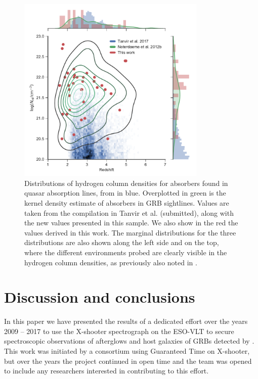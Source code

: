 \documentclass{aa}    %
\begin{document}
\begin{figure}[!ht]
	\centering \includegraphics[width=9cm]{figures/NH_dist.pdf}
\caption{Distributions of hydrogen column densities for absorbers found in
	quasar absorption lines, from \citet{Noterdaeme2012b} in blue. Overplotted in
	green is the kernel density estimate of absorbers in GRB sightlines. Values are
	taken from the compilation in Tanvir et al. (submitted), along with the new
	values presented in this sample. We also show in the red the values derived in
	this work. The marginal distributions for the three distributions are also shown
	along the left side and on the top, where the different environments probed are
	clearly visible in the hydrogen column densities, as previously also noted in
	\citet{Fynbo2009}.} \label{fig:NH_dist}
\end{figure}



\section{Discussion and conclusions}\label{conclusions}

In this paper we have presented the results of a dedicated effort over the years
2009 -- 2017 to use the X-shooter spectrograph on the ESO-VLT to secure
spectroscopic observations of afterglows and host galaxies of GRBs detected by
\swift. This work was initiated by a consortium using Guaranteed Time on
X-shooter, but over the years the project continued in open time and the team
was opened to include any researchers interested in contributing to this effort.
\end{document}
